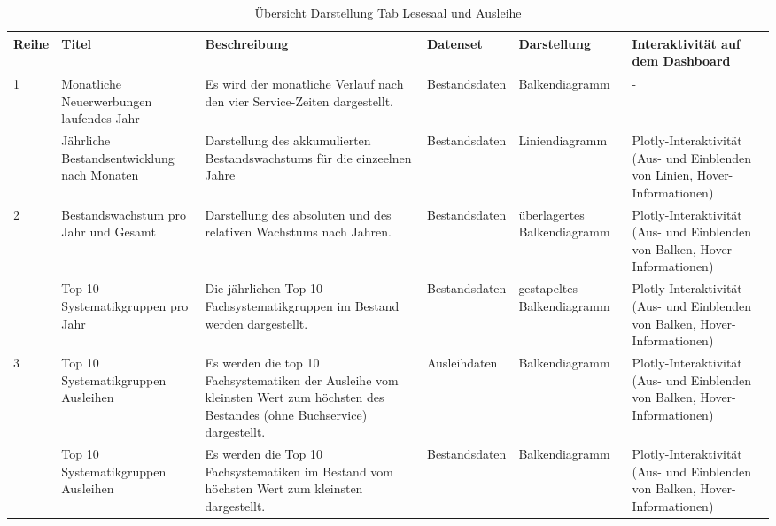     \begin{table}[h]
        \centering
        \begin{adjustbox}{max width=\textwidth}
        \begin{tabular}{p{}p{}p{}p{}p{}p{}}
           \toprule
           Reihe        &Titel &Beschreibung &Datenset &Darstellung &Interaktivität auf dem Dashboard\\
           \midrule
            1           &Monatliche Neuerwerbungen laufendes Jahr&Es wird der monatliche Verlauf nach den vier Service-Zeiten dargestellt.&Bestandsdaten&Balkendiagramm&-\\
                        &Jährliche Bestandsentwicklung nach Monaten&Darstellung des akkumulierten Bestandswachstums für die einzeelnen Jahre&Bestandsdaten&Liniendiagramm    &Plotly-Interaktivität (Aus- und Einblenden von Linien, Hover-Informationen)\\          
            \midrule
            2           &Bestandswachstum pro Jahr und Gesamt&Darstellung des absoluten und des relativen Wachstums nach Jahren.&Bestandsdaten&überlagertes Balkendiagramm&Plotly-Interaktivität (Aus- und Einblenden von Balken, Hover-Informationen)\\
                        &Top 10 Systematikgruppen pro Jahr&Die jährlichen Top 10 Fachsystematikgruppen im Bestand werden dargestellt.&Bestandsdaten    &gestapeltes Balkendiagramm&Plotly-Interaktivität (Aus- und Einblenden von Balken, Hover-Informationen)\\
            \midrule
            3           &Top 10 Systematikgruppen Ausleihen&Es werden die top 10 Fachsystematiken der Ausleihe vom kleinsten Wert zum höchsten des Bestandes (ohne Buchservice) dargestellt.&Ausleihdaten&Balkendiagramm&Plotly-Interaktivität (Aus- und Einblenden von Balken, Hover-Informationen)\\
                        &Top 10 Systematikgruppen Ausleihen&Es werden die Top 10 Fachsystematiken im Bestand vom höchsten Wert zum kleinsten dargestellt.&Bestandsdaten&Balkendiagramm&Plotly-Interaktivität (Aus- und Einblenden von Balken, Hover-Informationen)\\

        \bottomrule
        \end{tabular}
        \end{adjustbox}
        \caption{%
            Übersicht Darstellung Tab Lesesaal und Ausleihe
        }
        \label{tab:Darstellung Tab Lesesaal und Ausleihe}
        \end{table}
    \endgroup

